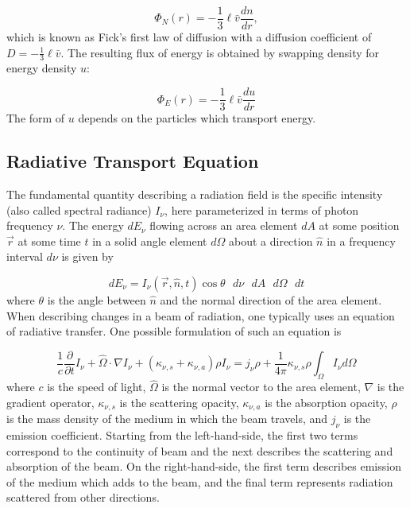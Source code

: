 \documentclass[12pt]{article}
\newcommand{\pderiv}[2]{\frac{\partial #1}{\partial #2}}
\newcommand{\deriv}[2]{\frac{d #1}{d #2}}
\begin{document}
\begin{equation}
    \Phi_N (r) = -\frac{1}{3} \ell \bar{v} \deriv{n}{r},
\end{equation}
%
which is known as Fick's first law of diffusion with a diffusion coefficient of $D = -\frac{1}{3}\ell \bar{v}$. The resulting flux of energy is obtained by swapping density for energy density $u$:

\begin{equation}
    \Phi_E(r) = -\frac{1}{3} \ell \bar{v} \deriv{u}{r}
\end{equation}
%
The form of $u$ depends on the particles which transport energy.

\subsection{Radiative Transport Equation}
The fundamental quantity describing a radiation field is the specific intensity (also called spectral radiance) $I_\nu$, here parameterized in terms of photon frequency $\nu$. The energy $dE_\nu$ flowing across an area element $dA$ at some position $\vec{r}$ at some time $t$ in a solid angle element $d\Omega$ about a direction $\hat{n}$ in a frequency interval $d\nu$ is given by

\begin{equation}
    dE_\nu  = I_\nu (\vec{r},\hat{n},t) \cos\theta \text{ } d\nu \text{ } dA \text{ } d\Omega \text{ } dt
\end{equation}
%
where $\theta$ is the angle between $\hat{n}$ and the normal direction of the area element. When describing changes in a beam of radiation, one typically uses an equation of radiative transfer. One possible formulation of such an equation is

\begin{equation}
    \frac{1}{c}\pderiv{}{t}I_\nu + \hat{\Omega} \cdot \nabla I_\nu + (\kappa_{\nu, s} + \kappa_{\nu, a})\rho I_\nu = j_\nu \rho + \frac{1}{4\pi} \kappa_{\nu, s} \rho \int_\Omega I_\nu d\Omega \label{eq:ap_transport_eq}
\end{equation}
%
where $c$ is the speed of light, $\hat{\Omega}$ is the normal vector to the area element, $\nabla$ is the gradient operator, $\kappa_{\nu, s}$ is the scattering opacity, $\kappa_{\nu, a}$ is the absorption opacity, $\rho$ is the mass density of the medium in which the beam travels, and $j_\nu$ is the emission coefficient. Starting from the left-hand-side, the first two terms correspond to the continuity of beam and the next describes the scattering and absorption of the beam. On the right-hand-side, the first term describes emission of the medium which adds to the beam, and the final term represents radiation scattered from other directions.
\end{document}
